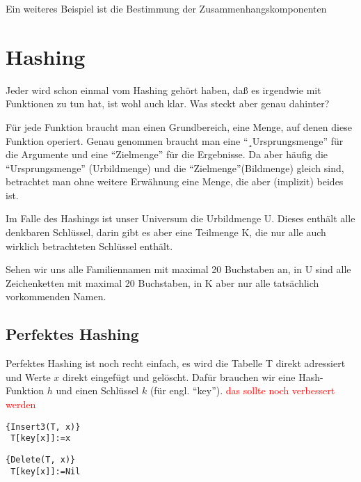 \documentclass[ngerman,draft,parskip=half*,twoside]{scrreprt}
\theoremstyle{break}
\theoremstyle{nonumberbreak}
\begin{document}
Ein weiteres Beispiel ist die Bestimmung der Zusammenhangskomponenten

\chapter{Hashing}
Jeder wird schon einmal vom Hashing gehört haben, daß es irgendwie mit Funktionen zu tun hat, ist wohl auch klar. Was
steckt aber genau dahinter?

Für jede Funktion braucht man einen Grundbereich, eine Menge, auf denen diese Funktion operiert. Genau genommen
braucht man eine "`¸Ursprungsmenge"' für die Argumente und eine "`Zielmenge"' für die Ergebnisse. Da aber häufig die
"`Ursprungsmenge"' (Urbildmenge) und die "`Zielmenge"'(Bildmenge) gleich sind, betrachtet man ohne weitere Erwähnung
eine Menge, die aber (implizit) beides ist.

Im Falle des Hashings ist unser Universum die Urbildmenge U. Dieses enthält alle denkbaren Schlüssel, darin gibt es
aber eine Teilmenge K, die nur alle auch wirklich betrachteten Schlüssel enthält.

Sehen wir uns alle Familiennamen mit maximal 20 Buchstaben an, in U sind alle Zeichenketten mit maximal 20 Buchstaben,
in K aber nur alle tatsächlich vorkommenden Namen.

\section{Perfektes Hashing}
Perfektes Hashing ist noch recht einfach, es wird die Tabelle T direkt adressiert und Werte $x$ direkt eingefügt und
gelöscht. Dafür brauchen wir eine Hash-Funktion $h$ und einen Schlüssel $k$ (für engl. "`key"').
\textcolor{red}{das sollte noch verbessert werden}

\begin{Algorithmus}[H]
\begin{lstlisting}[frame=tlrb, mathescape=true, title=\textsc{Insert\textnormal{(T, x)}},gobble=1]{Insert3(T, x)}
 T[key[x]]:=x
\end{lstlisting}
\end{Algorithmus} 

\begin{Algorithmus}[H]
\begin{lstlisting}[frame=tlrb, mathescape=true, title=\textsc{Delete\textnormal{(T, x)}},gobble=1]{Delete(T, x)}
 T[key[x]]:=Nil
\end{lstlisting}
\end{Algorithmus}
\end{document}
